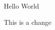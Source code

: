 \documentclass[A4paper, 12pt]{article}
\begin{document}
Hello World

This is a change
\end{document}

